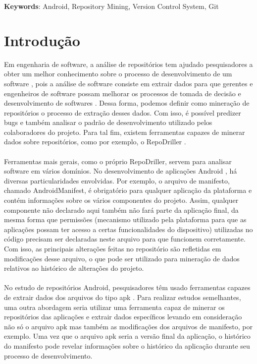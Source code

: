 \documentclass[a4paper,12pt]{article}
\begin{document}
\textbf{Keywords}: Android, Repository Mining, Version Control System, Git

\newpage

\tableofcontents

\newpage
\section{Introdução}

Em engenharia de software, a análise de repositórios tem ajudado pesquisadores a obter um melhor conhecimento sobre o processo de desenvolvimento de um software \cite{miningGit}, pois a análise de software consiste em extrair dados para que gerentes e engenheiros de software possam melhorar os processos de tomada de decisão e desenvolvimento de softwares \cite{soWhat}. Dessa forma, podemos definir como mineração de repositórios o processo de  extração desses dados. Com isso, é possível predizer bugs e também analisar o padrão de desenvolvimento utilizado pelos colaboradores do projeto. Para tal fim, existem ferramentas capazes de minerar dados sobre repositórios, como por exemplo, o RepoDriller \cite{repodriller}.\\
\\
Ferramentas mais gerais, como o próprio RepoDriller, servem para analisar software em vários domínios. No desenvolvimento de aplicações Android \cite{developer}, há diversas particularidades envolvidas. Por exemplo, o arquivo de manifesto, chamado AndroidManifest, é obrigatório para qualquer aplicação da plataforma e contém informações sobre os vários componentes do projeto. Assim, qualquer componente não declarado aqui também não fará parte da aplicação final, da mesma forma que permissões (mecanismo utilizado pela plataforma para que as aplicações possam ter acesso a certas funcionalidades do dispositivo) utilizadas no código precisam ser declaradas neste arquivo para que funcionem corretamente. Com isso, as principais alterações feitas no repositório são refletidas em modificações desse arquivo, o que pode ser utilizado para mineração de dados relativos ao histórico de alterações do projeto.\\
\\
No estudo de repositórios Android, pesquisadores têm usado ferramentas capazes
de extrair dados dos arquivos do tipo apk \cite{Calciati, WhoAdded, YLyu}. Para realizar estudos
semelhantes, uma outra abordagem seria utilizar uma ferramenta capaz de
minerar os repositórios das aplicações e extrair dados específicos levando em
consideração não só o arquivo apk mas também as modificações dos arquivos de
manifesto, por exemplo. Uma vez que o arquivo apk seria a versão final da aplicação, o histórico do manifesto pode revelar informações sobre o histórico da aplicação durante seu processo de desenvolvimento.\\
\end{document}

